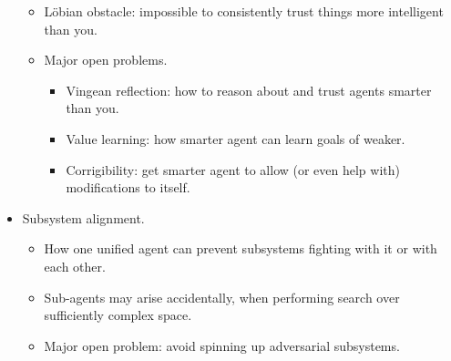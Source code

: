 \begin{itemize}
\begin{itemize}
        \item Löbian obstacle: impossible to consistently trust things more intelligent than you.
        \item Major open problems.
        \begin{itemize}
            \item Vingean reflection: how to reason about and trust agents smarter than you.
            \item Value learning: how smarter agent can learn goals of weaker.
            \item Corrigibility: get smarter agent to allow (or even help with) modifications to itself.
        \end{itemize}
    \end{itemize}
    \item Subsystem alignment.
    \begin{itemize}
        \item How one unified agent can prevent subsystems fighting with it or with each other.
        \item Sub-agents may arise accidentally, when performing search over sufficiently complex space.
        \item Major open problem: avoid spinning up adversarial subsystems.
    \end{itemize}
\end{itemize}